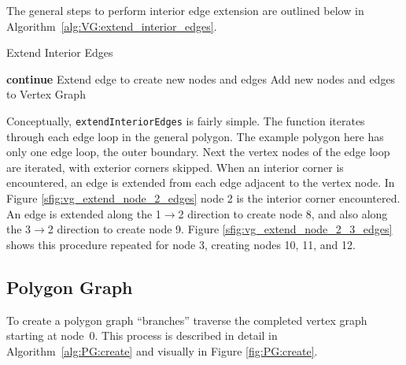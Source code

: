 The general steps to perform interior edge extension are outlined below in Algorithm~\ref{alg:VG:extend_interior_edges}.

\begin{algorithm}[htb]
\caption{Extend Interior Edges}\label{alg:VG:extend_interior_edges}
\begin{algorithmic}[1]
				\State \textbf{continue}
			\EndIf
				\State Extend edge to create new nodes and edges
				\State Add new nodes and edges to Vertex Graph
			\EndFor
		\EndFor
	\EndFor
\EndFunction
\end{algorithmic}
\end{algorithm}

Conceptually, \verb|extendInteriorEdges| is fairly simple.
The function iterates through each edge loop in the general polygon.
The example polygon here has only one edge loop, the outer boundary.
Next the vertex nodes of the edge loop are iterated, with exterior corners skipped.
When an interior corner is encountered, an edge is extended from each edge adjacent to the vertex node.
In Figure \ref{sfig:vg_extend_node_2_edges} node 2 is the interior corner encountered.
An edge is extended along the 1$\rightarrow$2 direction to create node 8, and also along the 3$\rightarrow$2 direction to create node 9.
Figure \ref{sfig:vg_extend_node_2_3_edges} shows this procedure repeated for node 3, creating nodes 10, 11, and 12.

\subsection{Polygon Graph}
To create a polygon graph ``branches'' traverse the completed vertex graph starting at node~0.
This process is described in detail in Algorithm~\ref{alg:PG:create} and visually in Figure \ref{fig:PG:create}.

